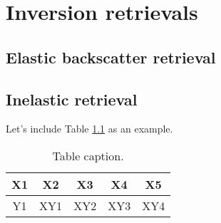 \chapter{Inversion retrievals}
\label{sect:devs02_chapter2}

\section{Elastic backscatter retrieval}
\label{sect::devs02_chapter2_elastic}

\section{Inelastic retrieval}
\label{sect::devs02_chapter2_inelastic}

Let's include Table \ref{tab::table01} as an example.

\begin{table}[h]     
	\caption{Table caption.}
	\label{tab::table01}
	\footnotesize
	\begin{center}
		\begin{tabular}{ccccc}
			\toprule
			X1 & X2 & X3 & X4 & X5\\
			\midrule
            Y1 & XY1 & XY2 & XY3 & XY4\\
			\bottomrule
		\end{tabular}
	\end{center}
\end{table}